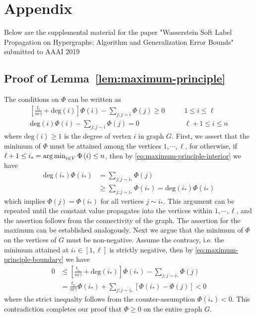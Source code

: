 \documentclass[letterpaper]{article} %
\begin{document}
	\clearpage
	\section{Appendix}
	
	

		Below are the supplemental material for the paper  "Wasserstein Soft Label Propagation on Hypergraphs: Algorithm and Generalization Error Bounds"   submitted to AAAI 2019 

	
	\subsection{Proof of Lemma~\ref{lem:maximum-principle}}
	The conditions on $\Phi$ can be written as
	\begin{align}
	\left[\frac{t_i}{m\gamma}+\mathrm{deg}\left(i\right)\right]\Phi \left( i \right)-\sum_{j:j\sim i}\Phi \left( j \right)\geq 0 & \qquad 1\leq i\leq \ell\label{eq:maximum-principle-boundary}\\
	\mathrm{deg}\left(i\right)\Phi \left( i \right)-\sum_{j:j\sim i}\Phi \left( j \right)=0 & \qquad \ell+1\leq i\leq n\label{eq:maximum-principle-interior}
	\end{align}
	where $\mathrm{deg}\left( i \right)\geq 1$ is the degree of vertex $i$ in graph $G$. First, we assert that the minimum of $\Phi$ must be attained among the vertices $1,\cdots,\ell$, for otherwise, if $\ell+1\leq i_*=\mathop{\rm arg\, min}_{i\in V}\Phi \left( i \right)\leq n$, then by \eqref{eq:maximum-principle-interior} we have
	\begin{equation*}
	\begin{aligned}
	\mathrm{deg}\left(i_*\right)\Phi \left( i_* \right)&=\sum_{j:j\sim i_*}\Phi \left( j \right)\\
	&\geq \sum_{j:j\sim i_*}\Phi \left( i_* \right)=\mathrm{deg}\left(i_*\right)\Phi \left( i_* \right)
	\end{aligned}
	\end{equation*}
	which implies $\Phi \left( j \right)=\Phi \left( i_* \right)$ for all vertices $j\sim i_*$. This argument can be repeated until the constant value propagates into the vertices within $1,\cdots,\ell$, and the assertion follows from the connectivity of the graph. The assertion for the maximum can be established analogously. Next we argue that the minimum of $\Phi$ on the vertices of $G$ must be non-negative. Assume the contracy, i.e. the minimum attained at $i_*\in \left[ 1,\ell \right]$ is strictly negative, then by \eqref{eq:maximum-principle-boundary} we have
	\begin{equation*}
	\begin{aligned}
	0 &\leq \left[\frac{t_{i_*}}{m\gamma}+\mathrm{deg}\left(i_{*}\right)\right]\Phi \left( i_{*} \right)-\sum_{j:j\sim i_{*}}\Phi \left( j \right)\\
	&=\frac{t_{i_*}}{m\gamma}\Phi \left( i_* \right)+\sum_{j:j\sim i_*}\left[ \Phi \left( i_* \right)-\Phi \left( j \right) \right]<0
	\end{aligned}
	\end{equation*}
	where the strict inequalty follows from the counter-assumption $\Phi \left( i_{*} \right)<0$. This contradiction completes our proof that $\Phi \geq 0$ on the entire graph $G$.
	
\end{document}
